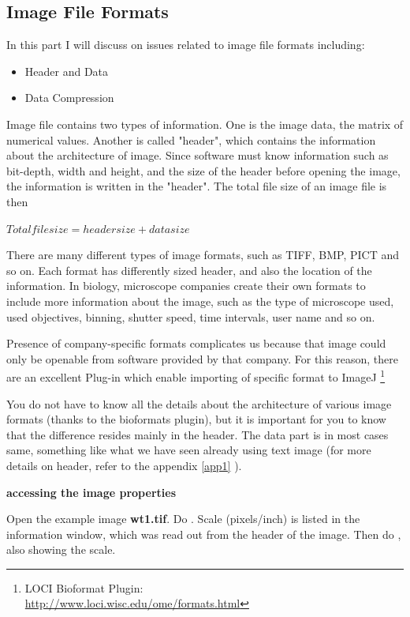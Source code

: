 \subsection{Image File Formats}

In this part I will discuss on issues related to image file formats including:

\begin{itemize}
	\item Header and Data
	\item Data Compression
\end{itemize}

Image file contains two types of information. 
One is the image data, the matrix of numerical values. 
Another is called "header", which contains the information about the architecture of image. 
Since software must know information such as bit-depth, width and height, and the size of 
the header before opening the image, the information is written in the "header". 
The total file size of an image file is then 

$Total file size = header size + data size$

There are many different types of image formats, such as TIFF, BMP, PICT and so
on. Each format has differently sized header, and also the location of the
information. In biology, microscope companies create their own formats to
include more information about the image, such as the type of microscope used,
used objectives, binning, shutter speed, time intervals, user name and so on.

Presence of company-specific formats complicates us because that image could
only be openable from software provided by that company. For this reason, there
are an excellent Plug-in which enable importing of specific format to ImageJ
\footnote{\tab LOCI Bioformat Plugin:\\
\url{http://www.loci.wisc.edu/ome/formats.html}}

You do not have to know all the details about the architecture of various image
formats (thanks to the bioformats plugin), but it is important for you to know
that the difference resides mainly in the header. The data part is in most cases
same, something like what we have seen already using text image (for more
details on header, refer to the appendix \ref{app1} ).

\begin{indentexercise}{1}

\textbf{accessing the image properties}

Open the example image \textbf{wt1.tif}. Do
. Scale (pixels/inch)
is listed in the information window, which was read out from the header
of the image. Then do ,
also showing the scale. 
\end{indentexercise}

